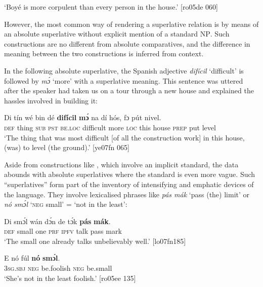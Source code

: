 \glt ‘Boyé is more corpulent than every person in the house.’ [ro05de 060]
\z

However, the most common way of rendering a superlative relation is by means of an absolute superlative without explicit mention of a standard \textsc{NP}. Such constructions are no different from absolute comparatives, and the difference in meaning between the two constructions is inferred from context. 


In the following absolute superlative, the Spanish adjective \textit{difícil} ‘difficult’ is followed by \textit{mɔ́} ‘more’ with a superlative meaning. This sentence was uttered after the speaker had taken us on a tour through a new house and explained the hassles involved in building it:



\ea%
    \label{ex:key:490}
    \gll Di  tín    wé  bin  dé    \textbf{difícil}  \textbf{mɔ́}    na  dí  hós,    fɔ  pút  nivel.\\
\textsc{def}  thing  \textsc{sub}  \textsc{pst}  \textsc{be.loc}  difficult  more  \textsc{loc}  this  house  \textsc{prep}  put  level\\

\glt ‘The thing that was most difficult [of all the construction work] in this house, (was) to level (the ground).’ [ye07fn 065]
\z

Aside from constructions like , which involve an implicit standard, the data abounds with absolute superlatives where the standard is even more vague. Such “superlatives” form part of the inventory of intensifying and emphatic devices of the language. They involve lexicalised phrases like \textit{pás mák} ‘pass (the) limit’ or \textit{nó smɔ́l} ‘\textsc{neg} small’ = ‘not in the least’:


\ea%
    \label{ex:key:491}
    \gll Di  smɔ́l  wán  dɔ́n  de  tɔ́k  \textbf{pás}  \textbf{mák}.\\
\textsc{def}  small  one  \textsc{prf}  \textsc{ipfv}  talk  pass  mark\\

\glt ‘The small one already talks unbelievably well.’ [lo07fn185]
\z


\ea%
    \label{ex:key:492}
    \gll E    nó  fúl      \textbf{nó} \textbf{smɔ́l}.\\
\textsc{3sg.sbj}  \textsc{neg}  be.foolish  \textsc{neg}  be.small\\

\glt ‘She’s not in the least foolish.’ [ro05ee 135]
\z


